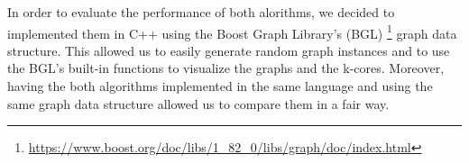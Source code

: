 \label{Evaluation}

In order to evaluate the performance of both alorithms, we decided to implemented them in C++ using the Boost Graph Library's (BGL) \footnote{\url{https://www.boost.org/doc/libs/1_82_0/libs/graph/doc/index.html}} graph data structure. This allowed us to easily generate random graph instances and to use the BGL's built-in functions to visualize the graphs and the k-cores. Moreover, having the both algorithms implemented in the same language and using the same graph data structure allowed us to compare them in a fair way.